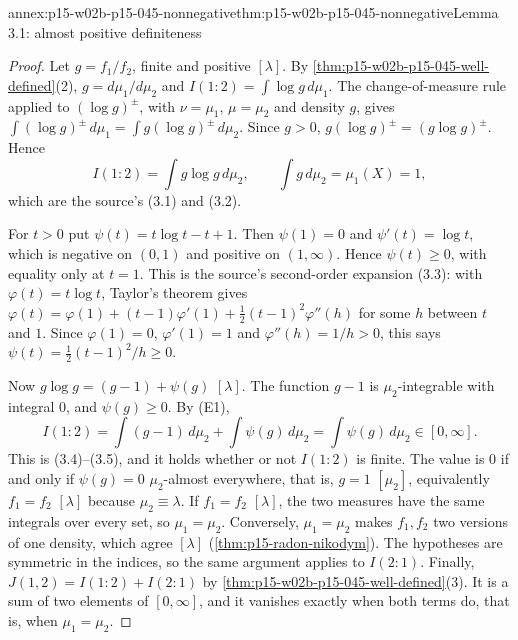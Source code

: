 \begin{annexitem}{annex:p15-w02b-p15-045-nonnegative}{thm:p15-w02b-p15-045-nonnegative}{Lemma 3.1: almost positive definiteness}
\begin{proof}
Let \(g=f_1/f_2\), finite and positive \([\lambda]\). By
\cref{thm:p15-w02b-p15-045-well-defined}(2), \(g=d\mu_1/d\mu_2\) and
\(I(1:2)=\int\log g\,d\mu_1\). The change-of-measure rule applied to
\((\log g)^\pm\), with \(\nu=\mu_1\), \(\mu=\mu_2\) and density \(g\),
gives \(\int(\log g)^\pm\,d\mu_1=\int g(\log g)^\pm\,d\mu_2\). Since
\(g>0\), \(g(\log g)^\pm=(g\log g)^\pm\). Hence
\[
  I(1:2)=\int g\log g\,d\mu_2,\qquad \int g\,d\mu_2=\mu_1(X)=1,
\]
which are the source's (3.1) and (3.2).

For \(t>0\) put \(\psi(t)=t\log t-t+1\). Then \(\psi(1)=0\) and
\(\psi'(t)=\log t\), which is negative on \((0,1)\) and positive on
\((1,\infty)\). Hence \(\psi(t)\geq0\), with equality only at \(t=1\).
This is the source's second-order expansion (3.3): with
\(\varphi(t)=t\log t\), Taylor's theorem gives
\(\varphi(t)=\varphi(1)+(t-1)\varphi'(1)+\tfrac12(t-1)^2\varphi''(h)\)
for some \(h\) between \(t\) and \(1\). Since \(\varphi(1)=0\),
\(\varphi'(1)=1\) and \(\varphi''(h)=1/h>0\), this says
\(\psi(t)=\tfrac12(t-1)^2/h\geq0\).

Now \(g\log g=(g-1)+\psi(g)\) \([\lambda]\). The function \(g-1\) is
\(\mu_2\)-integrable with integral \(0\), and \(\psi(g)\geq0\). By (E1),
\[
  I(1:2)=\int(g-1)\,d\mu_2+\int\psi(g)\,d\mu_2=\int\psi(g)\,d\mu_2\in[0,\infty].
\]
This is (3.4)--(3.5), and it holds whether or not \(I(1:2)\) is finite.
The value is \(0\) if and only if \(\psi(g)=0\) \(\mu_2\)-almost
everywhere, that is, \(g=1\) \([\mu_2]\), equivalently \(f_1=f_2\)
\([\lambda]\) because \(\mu_2\equiv\lambda\). If \(f_1=f_2\) \([\lambda]\),
the two measures have the same integrals over every set, so
\(\mu_1=\mu_2\). Conversely, \(\mu_1=\mu_2\) makes \(f_1,f_2\) two
versions of one density, which agree \([\lambda]\)
(\cref{thm:p15-radon-nikodym}). The hypotheses are symmetric in the
indices, so the same argument applies to \(I(2:1)\). Finally,
\(J(1,2)=I(1:2)+I(2:1)\) by
\cref{thm:p15-w02b-p15-045-well-defined}(3). It is a sum of two elements
of \([0,\infty]\), and it vanishes exactly when both terms do, that is,
when \(\mu_1=\mu_2\).
\end{proof}
\end{annexitem}

